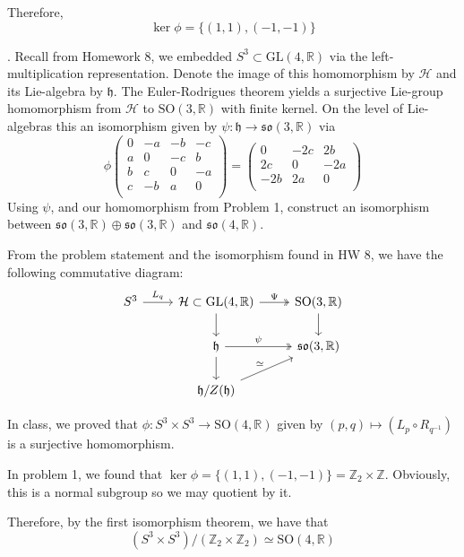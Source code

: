 \documentclass[12pt]{article}
\newcommand{\Z}{\mathbb{Z}}
\newcommand{\R}{\mathbb{R}}
\newcommand{\GL}{\text{GL}}
\newcommand{\SO}{\text{SO}}
\newcommand{\lra}{\longrightarrow}
\newcommand{\h}{\mathfrak{h}}
\newcommand{\so}{\mathfrak{so}}
\begin{document}
        Therefore, 
        \[\boxed{\ker \phi = \{(1, 1), (-1, -1)\}}\]
    \color{black}


.  Recall from Homework 8, we embedded $S^{3} \subset \GL(4,\R)$ via the left-multiplication representation.  Denote the image of this homomorphism by $\mathcal{H}$ and its Lie-algebra by $\h$.  The Euler-Rodrigues theorem yields a surjective Lie-group homomorphism from $\mathcal{H}$ to $\SO(3,\R)$ with finite kernel.  On the level of Lie-algebras this an isomorphism given by $\psi: \h \lra \mathfrak{so}(3,\R)$ via
\[
\phi\left(
\begin{array}{cccc}
 0 & -a & -b & -c \\
 a & 0 & -c & b \\
 b & c & 0 & -a \\
 c & -b & a & 0 \\
\end{array}
\right) = \left(
\begin{array}{ccc}
 0 & -2 c & 2 b \\
 2 c & 0 & -2 a \\
 -2 b & 2 a & 0 \\
\end{array}
\right)
\]
Using $\psi$, and our homomorphism from Problem 1, construct an isomorphism between $\mathfrak{so}(3,\R) \oplus \mathfrak{so}(3,\R)$ and $\mathfrak{so}(4,\R)$.  

    \color{blue}
        From the problem statement and the isomorphism found in HW 8, we have the following commutative diagram:
        \[\begin{tikzcd}
            S^3 \arrow{r}{L_q} & \mathcal{H} \subset \GL(4, \R) \arrow{d} \arrow[two heads]{r}{\Psi} & \SO(3, \R) \arrow{d}\\ 
            & \h \arrow{d} \arrow[two heads]{r}{\psi} & \so(3, \R)\\
            & \h/Z(\h) \arrow{ur}{\simeq}
        \end{tikzcd}\]

        In class, we proved that $\phi: S^3 \times S^3 \to \SO(4, \R)$ given by $(p, q) \mapsto (L_p \circ R_{q^{-1}})$ is a surjective homomorphism.
        
        In problem 1, we found that $\ker \phi = \{(1, 1), (-1, -1)\} = \Z_2 \times \Z$. Obviously, this is a normal subgroup so we may quotient by it. 

        Therefore, by the first isomorphism theorem, we have that 
        \[(S^3 \times S^3)/(\Z_2 \times \Z_2) \simeq \SO(4, \R)\]
\end{document}
